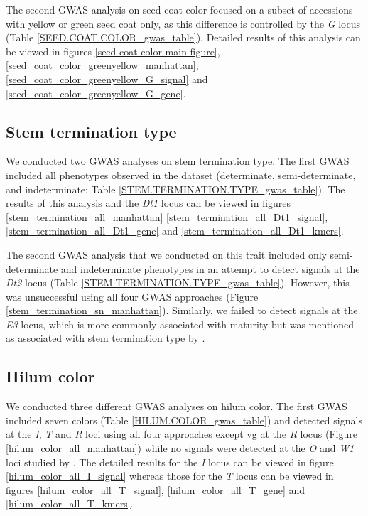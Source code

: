 The second GWAS analysis on seed coat color focused on a subset of accessions
with yellow or green seed coat only, as this difference is controlled by the
\emph{G} locus (Table \ref{SEED.COAT.COLOR_gwas_table}). Detailed results of
this analysis can be viewed in figures \ref{seed-coat-color-main-figure},
\ref{seed_coat_color_greenyellow_manhattan},
\ref{seed_coat_color_greenyellow_G_signal} and
\ref{seed_coat_color_greenyellow_G_gene}.

\subsection*{Stem termination type}
\label{sv-gwas-stem-termination}

We conducted two GWAS analyses on stem termination type. The first GWAS
included all phenotypes observed in the dataset (determinate, semi-determinate,
and indeterminate; Table \ref{STEM.TERMINATION.TYPE_gwas_table}). The results
of this analysis and the \textit{Dt1} locus can be viewed in figures \ref{stem_termination_all_manhattan}
\ref{stem_termination_all_Dt1_signal}, \ref{stem_termination_all_Dt1_gene} and
\ref{stem_termination_all_Dt1_kmers}.

The second GWAS analysis that we conducted on this trait included only
semi-determinate and indeterminate phenotypes in an attempt to detect signals
at the \emph{Dt2} locus (Table \ref{STEM.TERMINATION.TYPE_gwas_table}).
However, this was unsuccessful using all four GWAS
approaches (Figure \ref{stem_termination_sn_manhattan}). Similarly, we failed to
detect signals at the \textit{E3} locus, which is more commonly associated
with maturity but was mentioned as associated with stem termination type by
\cite{bandillo2017}.

\subsection*{Hilum color}
\label{sv-gwas-hilum-color}

We conducted three different GWAS analyses on hilum color. The first GWAS
included seven colors (Table \ref{HILUM.COLOR_gwas_table}) and detected signals
at the \emph{I}, \emph{T} and \emph{R} loci using all four approaches except vg
at the \emph{R} locus (Figure \ref{hilum_color_all_manhattan}) while no signals
were detected at the \emph{O} and \emph{W1} loci studied by
\cite{bandillo2017}. The detailed results for the \textit{I} locus can be viewed
in figure \ref{hilum_color_all_I_signal} whereas those for the \textit{T} locus
can be viewed in figures \ref{hilum_color_all_T_signal}, \ref{hilum_color_all_T_gene}
and \ref{hilum_color_all_T_kmers}.

